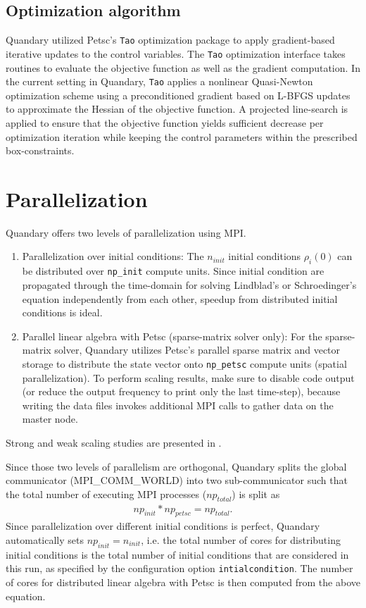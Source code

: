 \documentclass[11pt]{article}
\begin{document}
  \subsection{Optimization algorithm}
    Quandary utilized Petsc's \texttt{Tao} optimization package to apply gradient-based iterative updates to the control variables. The \texttt{Tao} optimization interface takes routines to evaluate the objective function as well as the gradient computation. In the current setting in Quandary, \texttt{Tao} applies a nonlinear Quasi-Newton optimization scheme using a preconditioned gradient based on L-BFGS updates to approximate the Hessian of the objective function. A projected line-search is applied to ensure that the objective function yields sufficient decrease per optimization iteration while keeping the control parameters within the prescribed box-constraints. 


    \section{Parallelization}
    Quandary offers two levels of parallelization using MPI. 
    \begin{enumerate}
    \item Parallelization over initial conditions: The $n_{init}$ initial conditions $\rho_i(0)$ can be distributed over \texttt{np\_init} compute units. Since initial condition are propagated through the time-domain for solving Lindblad's or Schroedinger's equation independently from each other, speedup from distributed initial conditions is ideal. 
    \item Parallel linear algebra with Petsc (sparse-matrix solver only): For the sparse-matrix solver, Quandary utilizes Petsc's parallel sparse matrix and vector storage to distribute the state vector onto \texttt{np\_petsc} compute units (spatial parallelization). To perform scaling results, make sure to disable code output (or reduce the output frequency to print only the last time-step), because writing the data files invokes additional MPI calls to gather data on the master node.
    \end{enumerate}
    Strong and weak scaling studies are presented in \cite{guenther2021quantum}.

    Since those two levels of parallelism are orthogonal, Quandary splits the global communicator (MPI\_COMM\_WORLD) into
    two sub-communicator such that the total number of executing MPI
    processes ($np_{total}$) is split as
    \begin{align*}
      np_{init} * np_{petsc} = np_{total}.
    \end{align*}
    Since parallelization over different initial conditions is perfect, Quandary automatically sets $np_{init} = n_{init}$, i.e. the total number of cores for distributing initial conditions is the total number of initial conditions that are considered in this run, as specified by the configuration option \texttt{intialcondition}. The number of cores for distributed linear algebra with Petsc is then computed from the above equation.
\end{document}
